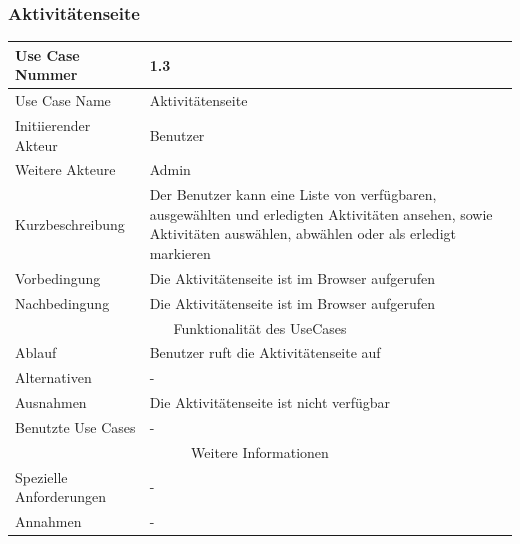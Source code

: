 \documentclass[10pt,a4paper]{article}
\begin{document}
	\subsubsection{Aktivit\"atenseite}
	\begin{tabular}{|l|p{.5\linewidth}|}
	\hline Use Case Nummer & 1.3 \\ 
	\hline Use Case Name & Aktivit\"atenseite \\ 
	\hline Initiierender Akteur & Benutzer \\
	\hline Weitere Akteure & Admin \\
	\hline Kurzbeschreibung & Der Benutzer kann eine Liste von verf\"ugbaren, ausgew\"ahlten und erledigten Aktivit\"aten ansehen, sowie Aktivit\"aten ausw\"ahlen, abw\"ahlen oder als erledigt markieren \\
	\hline Vorbedingung & Die Aktivit\"atenseite ist im Browser aufgerufen \\
	\hline Nachbedingung & Die Aktivit\"atenseite ist im Browser aufgerufen \\
	\hline \multicolumn{2}{|c|}{Funktionalität des UseCases}\\
	\hline Ablauf & Benutzer ruft die Aktivit\"atenseite auf \\
	\hline Alternativen & - \\
	\hline Ausnahmen & Die Aktivit\"atenseite ist nicht verf\"ugbar \\
	\hline Benutzte Use Cases & - \\
	\hline \multicolumn{2}{|c|}{Weitere Informationen} \\
	\hline Spezielle Anforderungen & - \\
	\hline Annahmen & - \\
	\hline
	\end{tabular} 
\end{document}

